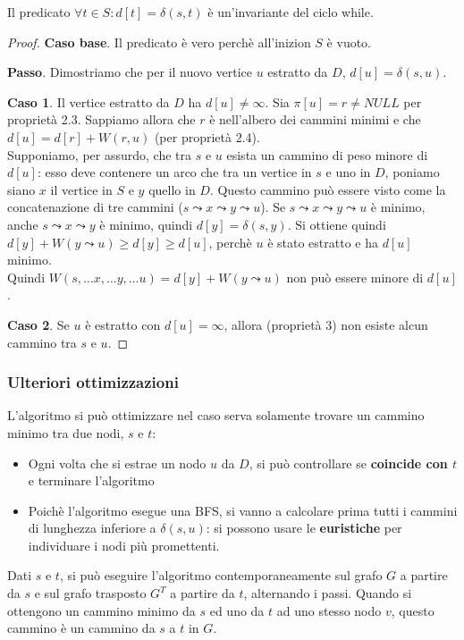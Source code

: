 \documentclass[11pt]{article}
\begin{document}
Il predicato $\forall t \in S : d[t]=\delta(s,t)$ è un'invariante del ciclo while.
\begin{proof}
    \textbf{Caso base}. Il predicato è vero perchè all'inizion $S$ è vuoto.

    \textbf{Passo}. Dimostriamo che per il nuovo vertice $u$ estratto da $D$, $d[u]=\delta(s,u)$.

    \textbf{Caso 1}. Il vertice estratto da $D$ ha $d[u]\neq \infty$. Sia $\pi[u]=r\neq NULL$ per proprietà 2.3. Sappiamo 
    allora che $r$ è nell'albero dei cammini minimi e che $d[u]=d[r]+W(r,u)$ (per proprietà 2.4).\\
    Supponiamo, per assurdo, che tra $s$ e $u$ esista un cammino di peso minore di $d[u]$: esso deve contenere un arco che 
    tra un vertice in $s$ e uno in $D$, poniamo siano $x$ il vertice in $S$ e $y$ quello in $D$. Questo cammino può essere 
    visto come la concatenazione di tre cammini ($s\leadsto x\leadsto y \leadsto u$). Se $s\leadsto x\leadsto y \leadsto u$ 
    è minimo, anche $s\leadsto x\leadsto y$ è minimo, quindi $d[y]=\delta(s,y)$. Si ottiene quindi $d[y]+W(y\leadsto u)\geq d[y]\geq d[u]$,
    perchè $u$ è stato estratto e ha $d[u]$ minimo.\\
    Quindi $W(s,\dots x,\dots y,\dots u)=d[y]+W(y\leadsto u)$ non può essere minore di $d[u]$.

    \textbf{Caso 2}. Se $u$ è estratto con $d[u]=\infty$, allora (proprietà 3) non esiste alcun cammino tra $s$ e $u$.
\end{proof} 
\subsubsection{Ulteriori ottimizzazioni}
L'algoritmo si può ottimizzare nel caso serva solamente trovare un cammino minimo tra due nodi, $s$ e $t$:
\begin{itemize}
    \item Ogni volta che si estrae un nodo $u$ da $D$, si può controllare se \textbf{coincide con $t$} e terminare l'algoritmo 
    \item Poichè l'algoritmo esegue una BFS, si vanno a calcolare prima tutti i cammini di lunghezza inferiore a $\delta(s,u)$:
    si possono usare le \textbf{euristiche} per individuare i nodi più promettenti.
\end{itemize}
Dati $s$ e $t$, si può eseguire l'algoritmo contemporaneamente sul grafo $G$ a partire da $s$ e sul grafo trasposto $G^T$ 
a partire da $t$, alternando i passi. Quando si ottengono un cammino minimo da $s$ ed uno da $t$ ad uno stesso nodo $v$,
questo cammino è un cammino da $s$ a $t$ in $G$.
\end{document}
